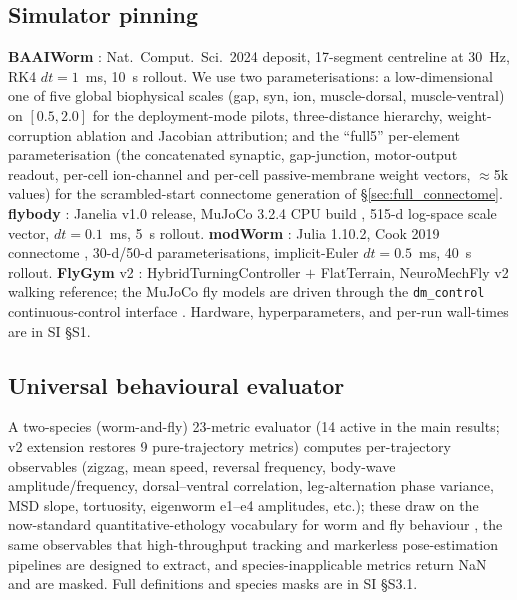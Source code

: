 \documentclass[11pt]{article}
\begin{document}
\subsection{Simulator pinning}
\textbf{BAAIWorm} \citep{wang2025baaiworm}: Nat.\ Comput.\ Sci.\ 2024 deposit, 17-segment centreline at 30~Hz, RK4 $dt{=}1$~ms, 10~s rollout. We use two parameterisations: a low-dimensional one of five global biophysical scales (gap, syn, ion, muscle-dorsal, muscle-ventral) on $[0.5,2.0]$ for the deployment-mode pilots, three-distance hierarchy, weight-corruption ablation and Jacobian attribution; and the ``full5'' per-element parameterisation (the concatenated synaptic, gap-junction, motor-output readout, per-cell ion-channel and per-cell passive-membrane weight vectors, $\approx$5k values) for the scrambled-start connectome generation of \S\ref{sec:full_connectome}. \textbf{flybody} \citep{vaxenburg2025flybody}: Janelia v1.0 release, MuJoCo 3.2.4 CPU build \citep{todorov2012mujoco}, 515-d log-space scale vector, $dt{=}0.1$~ms, 5~s rollout. \textbf{modWorm} \citep{shlizerman2025modworm}: Julia 1.10.2, Cook 2019 connectome \citep{cook2019connectome}, 30-d/50-d parameterisations, implicit-Euler $dt{=}0.5$~ms, 40~s rollout. \textbf{FlyGym} v2 \citep{wangchen2024neuromechfly}: HybridTurningController $+$ FlatTerrain, NeuroMechFly v2 walking reference; the MuJoCo fly models are driven through the \texttt{dm\_control} continuous-control interface \citep{tunyasuvunakool2020dmcontrol}. Hardware, hyperparameters, and per-run wall-times are in SI \S S1.

\subsection{Universal behavioural evaluator}
A two-species (worm-and-fly) 23-metric evaluator (14 active in the main results; v2 extension restores 9 pure-trajectory metrics) computes per-trajectory observables (zigzag, mean speed, reversal frequency, body-wave amplitude/frequency, dorsal--ventral correlation, leg-alternation phase variance, MSD slope, tortuosity, eigenworm e1--e4 amplitudes, etc.); these draw on the now-standard quantitative-ethology vocabulary for worm and fly behaviour \citep{stephens2008dimensionality,brown2013dictionary,pereira2020quantifying}, the same observables that high-throughput tracking \citep{branson2009highthroughput} and markerless pose-estimation pipelines \citep{pereira2022sleap,karashchuk2021anipose} are designed to extract, and species-inapplicable metrics return NaN and are masked. Full definitions and species masks are in SI \S S3.1.
\end{document}
